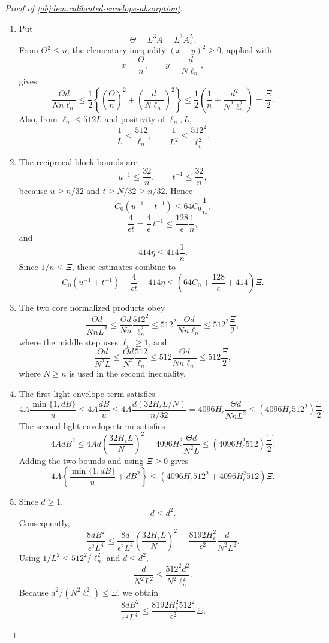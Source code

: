 \documentclass[11pt]{article}
\begin{document}
\begin{proof}[Proof of \cref{obj:lem:calibrated-envelope-absorption}]
\begin{enumerate}
\item Put
\[
\Theta=L^3A=L^3A_\star^L.
\]
From \(\Theta^2\le n\), the elementary inequality \((x-y)^2\ge0\), applied with
\[
x=\frac{\Theta}{n},
\qquad
y=\frac{d}{N\ell_n},
\]
gives
\[
\frac{\Theta d}{Nn\ell_n}
\le
\frac12\left\{\left(\frac{\Theta}{n}\right)^2
+\left(\frac{d}{N\ell_n}\right)^2\right\}
\le
\frac12\left(\frac1n+\frac{d^2}{N^2\ell_n^2}\right)
=
\frac{\Xi}{2}.
\]
Also, from \(\ell_n\le512L\) and positivity of \(\ell_n,L\),
\[
\frac1L\le\frac{512}{\ell_n},
\qquad
\frac1{L^2}\le\frac{512^2}{\ell_n^2}.
\]

\item The reciprocal block bounds are
\[
u^{-1}\le\frac{32}{n},
\qquad
t^{-1}\le\frac{32}{n},
\]
because \(u\ge n/32\) and \(t\ge N/32\ge n/32\). Hence
\[
C_0(u^{-1}+t^{-1})
\le
64C_0\frac1n,
\]
\[
\frac4{\epsilon t}
=
\frac4\epsilon\,t^{-1}
\le
\frac{128}{\epsilon}\frac1n,
\]
and
\[
414\eta\le414\frac1n.
\]
Since \(1/n\le\Xi\), these estimates combine to
\[
C_0(u^{-1}+t^{-1})+\frac4{\epsilon t}+414\eta
\le
\left(64C_0+\frac{128}{\epsilon}+414\right)\Xi .
\]

\item The two core normalized products obey
\[
\frac{\Theta d}{NnL^2}
\le
\frac{\Theta d}{Nn}\frac{512^2}{\ell_n^2}
\le
512^2\frac{\Theta d}{Nn\ell_n}
\le
512^2\frac{\Xi}{2},
\]
where the middle step uses \(\ell_n\ge1\), and
\[
\frac{\Theta d}{N^2L}
\le
\frac{\Theta d}{N^2}\frac{512}{\ell_n}
\le
512\frac{\Theta d}{Nn\ell_n}
\le
512\frac{\Xi}{2},
\]
where \(N\ge n\) is used in the second inequality. %

\item The first light-envelope term satisfies
\[
4A\frac{\min\{1,dB\}}{u}
\le
4A\frac{dB}{u}
\le
4A\frac{d(32H_\epsilon L/N)}{n/32}
=
4096H_\epsilon\frac{\Theta d}{NnL^2}
\le
(4096H_\epsilon512^2)\frac{\Xi}{2}.
\]
The second light-envelope term satisfies
\[
4AdB^2
\le
4Ad\left(\frac{32H_\epsilon L}{N}\right)^2
=
4096H_\epsilon^2\frac{\Theta d}{N^2L}
\le
(4096H_\epsilon^2 512)\frac{\Xi}{2}.
\]
Adding the two bounds and using \(\Xi\ge0\) gives
\[
4A\left\{\frac{\min\{1,dB\}}u+dB^2\right\}
\le
(4096H_\epsilon512^2+4096H_\epsilon^2 512)\Xi .
\]

\item Since \(d\ge1\),
\[
d\le d^2.
\]
Consequently,
\[
\frac{8dB^2}{\epsilon^2L^4}
\le
\frac{8d}{\epsilon^2L^4}
\left(\frac{32H_\epsilon L}{N}\right)^2
=
\frac{8192H_\epsilon^2}{\epsilon^2}
\frac{d}{N^2L^2}.
\]
Using \(1/L^2\le512^2/\ell_n^2\) and \(d\le d^2\),
\[
\frac{d}{N^2L^2}
\le
\frac{512^2d^2}{N^2\ell_n^2}.
\]
Because \(d^2/(N^2\ell_n^2)\le\Xi\), we obtain
\[
\frac{8dB^2}{\epsilon^2L^4}
\le
\frac{8192H_\epsilon^2 512^2}{\epsilon^2}\,\Xi .
\]


\end{enumerate}
\end{proof}
\end{document}
